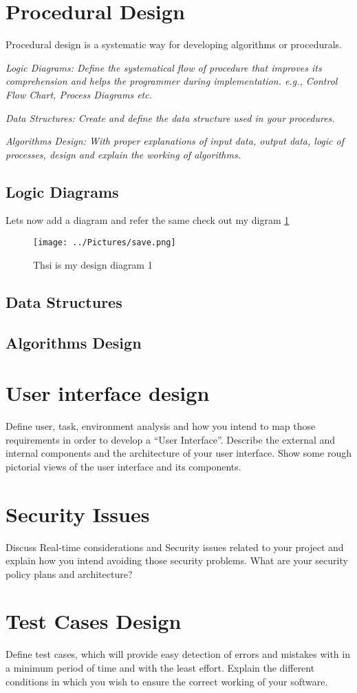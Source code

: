 \section{Procedural Design}
Procedural design is a systematic way for developing algorithms or procedurals.

\textit{Logic Diagrams: Define the systematical flow of procedure that improves its comprehension and helps the programmer during implementation. e.g., Control Flow Chart, Process Diagrams etc.}

\textit{Data Structures: Create and define the data structure used in your procedures.}

\textit{Algorithms Design: With proper explanations of input data, output data, logic of processes, design and explain the working of algorithms.}

\subsection{Logic Diagrams}
   Lets now add a diagram and refer the same check out my digram \ref{fig:mydesign1}
   \begin{figure}[h!]
 \texttt{[image: ../Pictures/save.png]}
 \caption{Thsi is my design diagram 1}
 \label{fig:mydesign1}
\end{figure}

\subsection{Data Structures}

\subsection{Algorithms Design}

\section{User interface design}
Define user, task, environment analysis and how you intend to map those requirements in order to develop a “User Interface”. Describe the external and internal components and the architecture of your user interface. Show some rough pictorial views of the user interface and its components.

\section{Security Issues}
Discuss Real-time considerations and Security issues related to your project and explain how you intend avoiding those security problems. What are your security policy plans and architecture?

\section{Test Cases Design}
Define test cases, which will provide easy detection of errors and mistakes with in a minimum period of time and with the least effort. Explain the different conditions in which you wish to ensure the correct working of your software.
